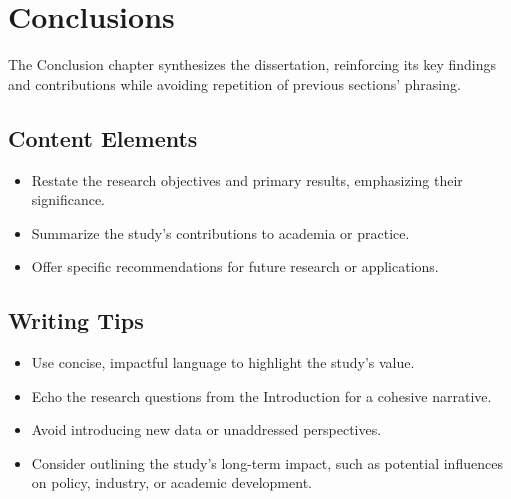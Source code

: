 \chapter{Conclusions}

The Conclusion chapter synthesizes the dissertation, reinforcing its key findings and contributions while avoiding repetition of previous sections’ phrasing.

\section{Content Elements}
\begin{itemize}
    \item Restate the research objectives and primary results, emphasizing their significance.
    \item Summarize the study’s contributions to academia or practice.
    \item Offer specific recommendations for future research or applications.

\end{itemize}

\section{Writing Tips}
\begin{itemize}
    \item Use concise, impactful language to highlight the study’s value.
    \item Echo the research questions from the Introduction for a cohesive narrative.
    \item Avoid introducing new data or unaddressed perspectives.
    \item Consider outlining the study’s long-term impact, such as potential influences on policy, industry, or academic development.

\end{itemize}
